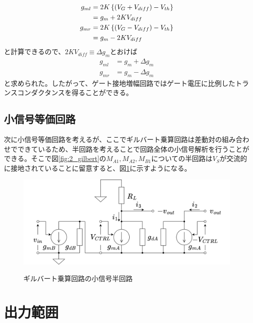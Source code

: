             \begin{align}
                g_{ml}&=2K\left\{ (V_{G}+V_{diff}) -V_{th} \right\}     \notag\\
                &=g_{m}+2KV_{diff}      \notag\\
                g_{mr}&=2K\left\{ (V_{G}-V_{diff}) -V_{th} \right\}     \notag\\
                &=g_{m}-2KV_{diff}      \notag
            \end{align}
            と計算できるので、$2KV_{diff}\equiv\Delta g_{m}$とおけば
            \begin{align}
                g_{ml}&=g_{m}+\Delta g_{m}   \label{eq:2_dgml}\\
                g_{mr}&=g_{m}-\Delta g_{m}   \label{eq:2_dgmr}
            \end{align}
            と求められた。したがって、ゲート接地増幅回路ではゲート電圧に比例したトランスコンダクタンスを得ることができる。
            \newpage
            
        \subsection{小信号等価回路}
            次に小信号等価回路を考えるが、ここでギルバート乗算回路は差動対の組み合わせでできているため、半回路を考えることで回路全体の小信号解析を行うことができる。そこで図\ref{fig:2_gilbert}の$M_{A1},M_{A2},M_{B1}$についての半回路は$V_{S}$が交流的に接地されていることに留意すると、図\ref{fig:2_halfeq}に示すようになる。
            \begin{figure}
                \begin{center}
                    \includegraphics[width=160mm]{figures/chapter2/halfeq.png}
                    \label{fig:2_halfeq}
                    \caption{ギルバート乗算回路の小信号半回路}
                \end{center}
            \end{figure}
            


    \section{出力範囲}

